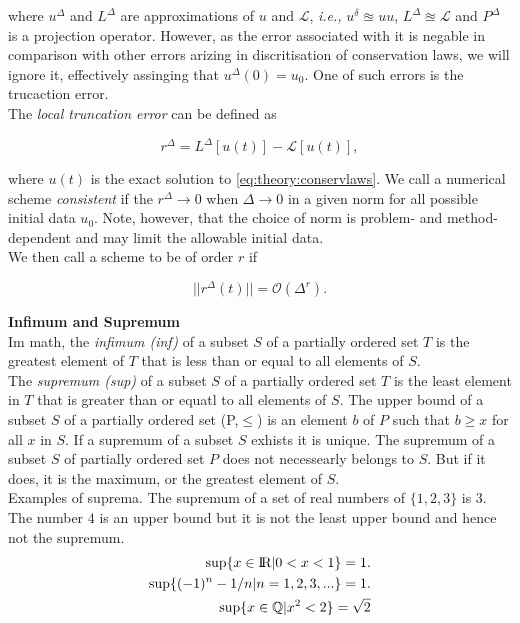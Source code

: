 \documentclass[11pt,a4paper,headinclude=true,DIV=14,BCOR=8mm,chapterprefix,listof=totoc,twoside,openright,abstracton]{scrbook}
\begin{document}
where $u^{\Delta}$ and $L^{\Delta}$ are approximations of $u$ and $\mathcal{L}$, \textit{i.e.,} $u^{\delta}\approxeq u u$, $L^{\Delta}\approxeq \mathcal{L}$ and $P^{\Delta}$ is a projection operator. However, as the error associated with it is negable in comparison with other errors arizing in discritisation of conservation laws, we will ignore it, effectively assinging that $u^{\Delta}(0) = u_0$. One of such errors is the trucaction error. \\
The \textit{ local truncation error} can be defined as 

\begin{equation}
    r^{\Delta} = L^{\Delta}[u(t)] - \mathcal{L}[u(t)],
\end{equation}

where $u(t)$ is the exact solution to \ref{eq:theory:conservlaws}. We call a numerical scheme \textit{consistent} if the $r^{\Delta}\rightarrow 0$ when $\Delta\rightarrow 0$ in a given norm for all possible initial data $u_0$. Note, however, that the choice of norm is problem- and method- dependent and may limit the allowable initial data. \\

We then call a scheme to be of order $r$ if 

\begin{equation}
    || r^{\Delta}(t) || = \mathcal{O}(\Delta^r).
\end{equation}

\begin{sidenote}
    \textbf{Infimum and Supremum} \\
    Im math, the \textit{infimum (inf)} of a subset $S$ of a partially ordered set $T$ is the greatest element of $T$ that is less than or equal to all elements of $S$. \\
    The \textit{supremum (sup)} of a subset $S$ of a partially ordered set $T$ is the least element in $T$ that is greater than or equatl to all elements of $S$. The upper bound of a subset $S$ of a partially ordered set (P,$\leq$) is an element $b$ of $P$ such that $b\geq x$ for all $x$ in $S$. If a supremum of a subset $S$ exhists it is unique. The supremum of a subset $S$ of partially ordered set $P$ does not necessearly belongs to $S$. But if it does, it is the maximum, or the greatest element of $S$. \\
    Examples of suprema.
    The supremum of a set of real numbers of $\{1,2,3\}$ is $3$. The number $4$ is an upper bound but it is not the least upper bound and hence not the supremum. \\
    \begin{align}
        \sup\{x\in\text{I\!R}|0<x<1\} = 1. \\
        \sup\{(-1)^n - 1/n | n = 1,2,3,... \} = 1. \\
        \sup\{x\in\mathbb{Q} | x^2 < 2\} = \sqrt{2}
    \end{align}
\end{sidenote}
\end{document}
